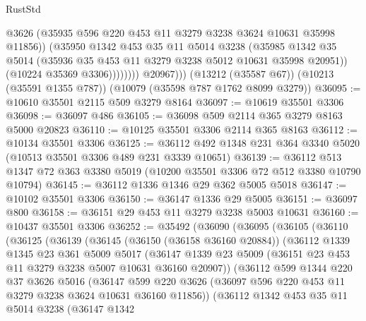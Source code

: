 \begin{lexlean}{RustStd}
\begin{coremodule}
                        @3626
                        (@35935 @596 @220 @453 @11 @3279 @3238 @3624 @10631 @35998 @11856))
                      (@35950
                        @1342
                        @453
                        @35
                        @11
                        @5014
                        @3238
                        (@35985
                          @1342
                          @35
                          @5014
                          (@35936 @35 @453 @11 @3279 @3238 @5012 @10631 @35998 @20951))
                        (@10224 @35369 @3306))))))))
          @20967)))
    (@13212 (@35587 @67))
    (@10213 (@35591 @1355 @787))
    (@10079 (@35598 @787 @1762 @8099 @3279))
@36095 := @10610 @35501 @2115 @509 @3279 @8164
@36097 := @10619 @35501 @3306
@36098 := @36097 @486
@36105 := @36098 @509 @2114 @365 @3279 @8163 @5000 @20823
@36110 := @10125 @35501 @3306 @2114 @365 @8163
@36112 := @10134 @35501 @3306
@36125 := @36112 @492 @1348 @231 @364 @3340 @5020 (@10513 @35501 @3306 @489 @231 @3339 @10651)
@36139 := @36112 @513 @1347 @72 @363 @3380 @5019 (@10200 @35501 @3306 @72 @512 @3380 @10790 @10794)
@36145 := @36112 @1336 @1346 @29 @362 @5005 @5018
@36147 := @10102 @35501 @3306
@36150 := @36147 @1336 @29 @5005
@36151 := @36097 @800
@36158 := @36151 @29 @453 @11 @3279 @3238 @5003 @10631
@36160 := @10437 @35501 @3306
@36252 := @35492
    (@36090
      (@36095
        (@36105
          (@36110
            (@36125
              (@36139
                (@36145
                  (@36150 (@36158 @36160 @20884))
                  (@36112
                    @1339
                    @1345
                    @23
                    @361
                    @5009
                    @5017
                    (@36147
                      @1339
                      @23
                      @5009
                      (@36151 @23 @453 @11 @3279 @3238 @5007 @10631 @36160 @20907))
                    (@36112
                      @599
                      @1344
                      @220
                      @37
                      @3626
                      @5016
                      (@36147
                        @599
                        @220
                        @3626
                        (@36097 @596 @220 @453 @11 @3279 @3238 @3624 @10631 @36160 @11856))
                      (@36112
                        @1342
                        @453
                        @35
                        @11
                        @5014
                        @3238
                        (@36147
                          @1342

\end{coremodule}
\end{lexlean}
